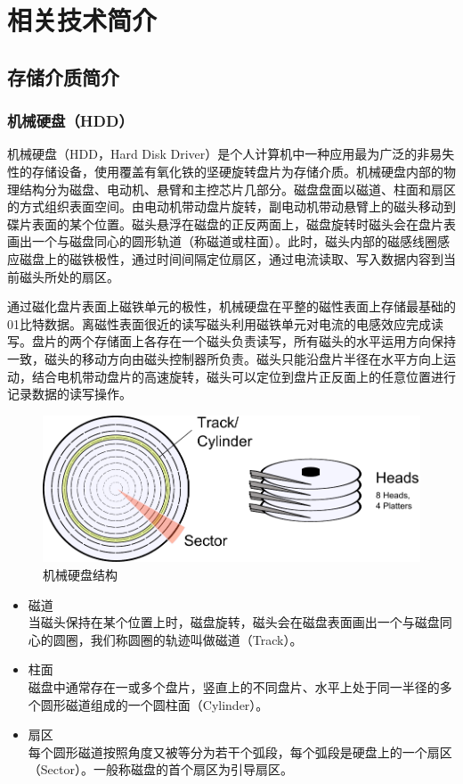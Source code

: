 
\chapter{相关技术简介}
\label{cha:related_work}

\section{存储介质简介}

\subsection{机械硬盘（HDD）}
机械硬盘\cite{hdd2009}（HDD，Hard Disk Driver）是个人计算机中一种应用最为广泛的非易失性的存储设备，使用覆盖有氧化铁的坚硬旋转盘片为存储介质。机械硬盘内部的物理结构分为磁盘、电动机、悬臂和主控芯片几部分。磁盘盘面以磁道、柱面和扇区的方式组织表面空间。由电动机带动盘片旋转，副电动机带动悬臂上的磁头移动到碟片表面的某个位置。磁头悬浮在磁盘的正反两面上，磁盘旋转时磁头会在盘片表画出一个与磁盘同心的圆形轨道（称磁道或柱面）。此时，磁头内部的磁感线圈感应磁盘上的磁铁极性，通过时间间隔定位扇区，通过电流读取、写入数据内容到当前磁头所处的扇区。

通过磁化盘片表面上磁铁单元的极性，机械硬盘在平整的磁性表面上存储最基础的01比特数据。离磁性表面很近的读写磁头利用磁铁单元对电流的电感效应完成读写。盘片的两个存储面上各存在一个磁头负责读写，所有磁头的水平运用方向保持一致，磁头的移动方向由磁头控制器所负责。磁头只能沿盘片半径在水平方向上运动，结合电机带动盘片的高速旋转，磁头可以定位到盘片正反面上的任意位置进行记录数据的读写操作。

\begin{figure}[H]
\centering
\includegraphics[width=0.6\linewidth]{./graph/hdd-struct}
\caption{机械硬盘结构}
\label{fig:hdd-struct}
\end{figure}

\begin{itemize}
\item 磁道
\\当磁头保持在某个位置上时，磁盘旋转，磁头会在磁盘表面画出一个与磁盘同心的圆圈，我们称圆圈的轨迹叫做磁道（Track）。
\item 柱面
\\磁盘中通常存在一或多个盘片，竖直上的不同盘片、水平上处于同一半径的多个圆形磁道组成的一个圆柱面（Cylinder）。
\item 扇区
\\每个圆形磁道按照角度又被等分为若干个弧段，每个弧段是硬盘上的一个扇区（Sector）。一般称磁盘的首个扇区为引导扇区。
\end{itemize}

